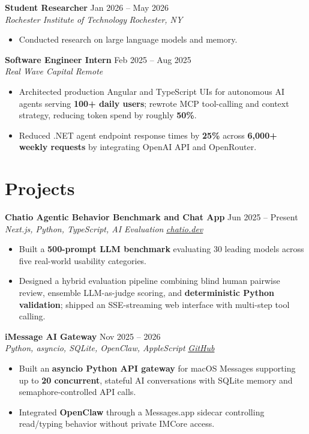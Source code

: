 \documentclass[10pt,letterpaper]{article}
\newcommand{\resumeRole}[4]{%
  \textbf{#1} \hfill #2\\
  \textit{#3} \hfill \textit{#4}
}
\newcommand{\majorGap}{\vspace{1pt plus 2fill}}
\newcommand{\entryGap}{\vspace{0pt plus 1fill}}
\begin{document}
\entryGap
\resumeRole{Student Researcher}{Jan 2026 -- May 2026}{Rochester Institute of Technology}{Rochester, NY}
\begin{itemize}
  \item Conducted research on large language models and memory.
\end{itemize}

\entryGap
\resumeRole{Software Engineer Intern}{Feb 2025 -- Aug 2025}{Real Wave Capital}{Remote}
\begin{itemize}
  \item Architected production Angular and TypeScript UIs for autonomous AI agents serving \textbf{100+ daily users}; rewrote MCP tool-calling and context strategy, reducing token spend by roughly \textbf{50\%}.
  \item Reduced .NET agent endpoint response times by \textbf{25\%} across \textbf{6,000+ weekly requests} by integrating OpenAI API and OpenRouter.
\end{itemize}

\majorGap
\section*{Projects}
\resumeRole{Chatio Agentic Behavior Benchmark and Chat App}{Jun 2025 -- Present}{Next.js, Python, TypeScript, AI Evaluation}{\href{https://chatio.dev}{chatio.dev}}
\begin{itemize}
  \item Built a \textbf{500-prompt LLM benchmark} evaluating 30 leading models across five real-world usability categories.
  \item Designed a hybrid evaluation pipeline combining blind human pairwise review, ensemble LLM-as-judge scoring, and \textbf{deterministic Python validation}; shipped an SSE-streaming web interface with multi-step tool calling.
\end{itemize}

\entryGap
\resumeRole{iMessage AI Gateway}{Nov 2025 -- 2026}{Python, asyncio, SQLite, OpenClaw, AppleScript}{\href{https://github.com/alextyhwang/iMessages-Chatbot-Server}{GitHub}}
\begin{itemize}
  \item Built an \textbf{asyncio Python API gateway} for macOS Messages supporting up to \textbf{20 concurrent}, stateful AI conversations with SQLite memory and semaphore-controlled API calls.
  \item Integrated \textbf{OpenClaw} through a Messages.app sidecar controlling read/typing behavior without private IMCore access.
\end{itemize}
\end{document}
